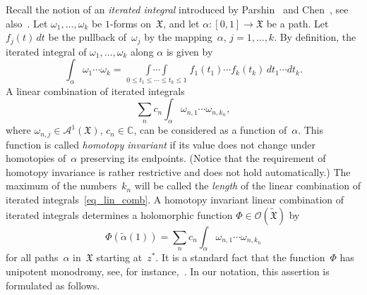 \documentclass[reqno,tbtags,12pt]{amsart}
\numberwithin{equation}{section}
\newcommand{\C}{\mathbb{C}}
\newcommand{\FX}{\mathfrak{X}}
\newcommand{\tFX}{\widetilde{\mathfrak{X}}}
\newcommand{\CO}{\mathcal{O}}
\newcommand{\A}{\mathcal{A}}
\newcommand{\talpha}{\widetilde{\alpha}}
\theoremstyle{definition}
\begin{document}
Recall the notion of an \textit{iterated integral\/} introduced by Parshin~\cite{Par66} and Chen~\cite{Che67}, see also~\cite{Che73}.
Let  $\omega_1,\ldots,\omega_k$  be  $1$-forms on~$\FX$, and let $\alpha\colon[0,1]\to\FX$ be a path. Let $f_j(t)\,dt$ be the pullback of~$\omega_j$ by the mapping~$\alpha$, $j=1,\ldots,k$. 
By definition, the iterated integral of  $\omega_1,\ldots,\omega_k$ along $\alpha$ is given by
$$
\int_{\alpha}\omega_1\cdots\omega_k=\mathop{\int\!\cdots\!\int}\limits_{0\le t_1\le \cdots \le t_k\le 1}f_1(t_1)\cdots f_k(t_k)\,dt_1\cdots dt_k.
$$ 
A linear combination of iterated integrals
\begin{equation}\label{eq_lin_comb}
\sum_{n}c_n\int_{\alpha}\omega_{n,1}\cdots\omega_{n,k_n},
\end{equation}
where $\omega_{n,j}\in\A^1(\FX)$, $c_n\in\C$, can be considered as a function of~$\alpha$. This function is called \textit{homotopy invariant\/} if its value does not change under homotopies of~$\alpha$ preserving its endpoints. (Notice that the requirement of homotopy invariance is rather restrictive and does not hold automatically.) The maximum of the numbers~$k_n$ will be called the \textit{length\/} of the  linear combination of iterated integrals~\eqref{eq_lin_comb}. A homotopy invariant linear combination of iterated integrals determines a holomorphic function $\Phi\in\CO(\tFX)$ by 
\begin{equation}\label{eq_hiii}
\Phi(\talpha(1))=\sum_{n}c_n\int_{\alpha}\omega_{n,1}\cdots\omega_{n,k_n}
\end{equation}
for all paths~$\alpha$ in~$\FX$ starting at~$z^*$. It is a standard fact that the function~$\Phi$ has unipotent monodromy, see, for instance,~\cite{Aom77}. In our notation, this assertion is formulated as follows.
\end{document}
